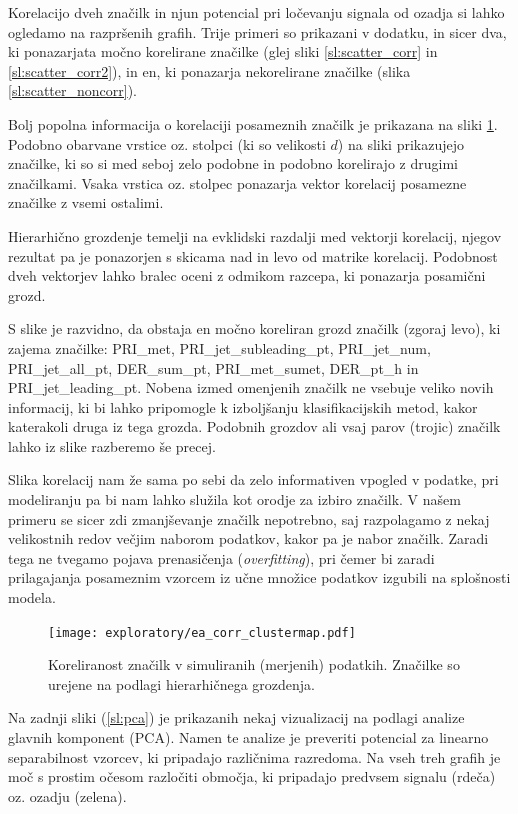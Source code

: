 \documentclass[11pt,a4paper,openany]{book}
\begin{document}
Korelacijo dveh značilk in njun potencial pri ločevanju signala od ozadja si lahko ogledamo na razpršenih grafih. Trije primeri so prikazani v dodatku, in sicer dva, ki ponazarjata močno korelirane značilke (glej sliki \ref{sl:scatter_corr} in \ref{sl:scatter_corr2}), in en, ki ponazarja nekorelirane značilke (slika \ref{sl:scatter_noncorr}).

Bolj popolna informacija o korelaciji posameznih značilk je prikazana na sliki \ref{sl:corr_clust_matrix}. Podobno obarvane vrstice oz. stolpci (ki so velikosti $d$) na sliki prikazujejo značilke, ki so si med seboj zelo podobne in podobno korelirajo z drugimi značilkami. Vsaka vrstica oz. stolpec ponazarja vektor korelacij posamezne značilke z vsemi ostalimi.

Hierarhično grozdenje temelji na evklidski razdalji med vektorji korelacij, njegov rezultat pa je ponazorjen s skicama nad in levo od matrike korelacij. Podobnost dveh vektorjev lahko bralec oceni z odmikom razcepa, ki ponazarja posamični grozd.

S slike je razvidno, da obstaja en močno koreliran grozd značilk (zgoraj levo), ki zajema značilke: PRI\_met, PRI\_jet\_subleading\_pt, PRI\_jet\_num, PRI\_jet\_all\_pt, DER\_sum\_pt, PRI\_met\_sumet, DER\_pt\_h in PRI\_jet\_leading\_pt. Nobena izmed omenjenih značilk ne vsebuje veliko novih informacij, ki bi lahko pripomogle k izboljšanju klasifikacijskih metod, kakor katerakoli druga iz tega grozda. Podobnih grozdov ali vsaj parov (trojic) značilk lahko iz slike razberemo še precej.

Slika korelacij nam že sama po sebi da zelo informativen vpogled v podatke, pri modeliranju pa bi nam lahko služila kot orodje za izbiro značilk. V našem primeru se sicer zdi zmanjševanje značilk nepotrebno, saj razpolagamo z nekaj velikostnih redov večjim naborom podatkov, kakor pa je nabor značilk. Zaradi tega ne tvegamo pojava prenasičenja (\textit{overfitting}), pri čemer bi zaradi prilagajanja posameznim vzorcem iz učne množice podatkov izgubili na splošnosti modela.

\begin{figure}[ht]
	\centering
	\texttt{[image: exploratory/ea\_corr\_clustermap.pdf]}
	\caption{Koreliranost značilk v simuliranih (merjenih) podatkih. Značilke so urejene na podlagi hierarhičnega grozdenja.}
	\label{sl:corr_clust_matrix}
\end{figure}

Na zadnji sliki (\ref{sl:pca}) je prikazanih nekaj vizualizacij na podlagi analize glavnih komponent (PCA). Namen te analize je preveriti potencial za linearno separabilnost vzorcev, ki pripadajo različnima razredoma. Na vseh treh grafih je moč s prostim očesom razločiti območja, ki pripadajo predvsem signalu (rdeča) oz. ozadju (zelena).
\end{document}
